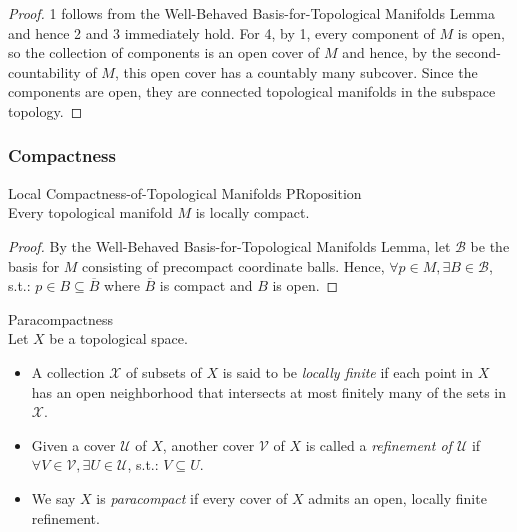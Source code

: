 \begin{proof}
    1 follows from the Well-Behaved Basis-for-Topological Manifolds Lemma and hence 2 and 3 immediately hold. For 4, by 1, every component of $M$ is open, so the collection of components is an open cover of $M$ and hence, by the second-countability of $M$, this open cover has a countably many subcover. Since the components are open, they are connected topological manifolds in the subspace topology.
\end{proof}

\subsubsection{Compactness}

\begin{proposition}{Local Compactness-of-Topological Manifolds PRoposition}\\
Every topological manifold $M$ is locally compact.
\end{proposition}

\begin{proof}
    By the Well-Behaved Basis-for-Topological Manifolds Lemma, let $\mathcal{B}$ be the basis for $M$ consisting of precompact coordinate balls. Hence, $\forall p\in M, \exists B\in \mathcal{B}$, s.t.: $p\in B\subseteq \overline{B}$ where $\overline{B}$ is compact and $B$ is open.
\end{proof}

\begin{definition}{Paracompactness}\\
Let $X$ be a topological space.
\begin{itemize}
    \item A collection $\mathcal{X}$ of subsets of $X$ is said to be \textit{locally finite} if each point in $X$ has an open neighborhood that intersects at most finitely many of the sets in $\mathcal{X}$.

    \item Given a cover $\mathcal{U}$ of $X$, another cover $\mathcal{V}$ of $X$ is called a \textit{refinement of $\mathcal{U}$} if $\forall V\in \mathcal{V}, \exists U\in \mathcal{U}$, s.t.: $V\subseteq U$.

    \item We say $X$ is \textit{paracompact} if every cover of $X$ admits an open, locally finite refinement.
\end{itemize}
\end{definition}

